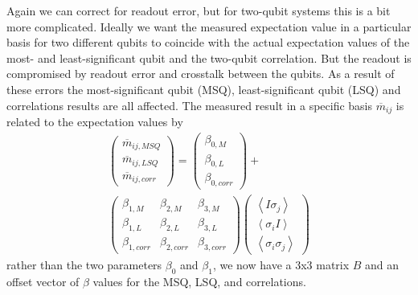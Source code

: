 Again we can correct for readout error, but for two-qubit systems this is a bit
more complicated. Ideally we want the measured expectation value in a particular
basis for two different qubits to coincide with the actual expectation values of
the most- and least-significant qubit and the two-qubit correlation. But the
readout is compromised by readout error and crosstalk between the qubits. As a
result of these errors the most-significant qubit (MSQ), least-significant qubit
(LSQ) and correlations results are all affected. The measured result in a
specific basis $\overline{m}_{ij}$ is related to the expectation values by
\begin{equation}
\label{beta}
\begin{split}
  \begin{pmatrix}
    \overline{m}_{ij,MSQ} \\ \overline{m}_{ij,LSQ} \\ \overline{m}_{ij,corr}
  \end{pmatrix} =
  \begin{pmatrix}
    \beta_{0,M} \\ \beta_{0,L} \\ \beta_{0,corr}
  \end{pmatrix} + \\
  \begin{pmatrix}
    \beta_{1,M}&\beta_{2,M}&\beta_{3,M} \\
    \beta_{1,L}&\beta_{2,L}&\beta_{3,L} \\
    \beta_{1,corr}&\beta_{2,corr}&\beta_{3,corr}
  \end{pmatrix}
  \begin{pmatrix}
    \left\langle I\sigma_j\right\rangle \\ \left\langle
      \sigma_iI\right\rangle \\ \left\langle \sigma_i\sigma_j\right\rangle
  \end{pmatrix}
\end{split}
\end{equation}
rather than the two parameters $\beta_0$ and $\beta_1$, we now have a 3x3
matrix $B$ and an offset vector of $\beta$ values for the MSQ, LSQ, and
correlations. 

